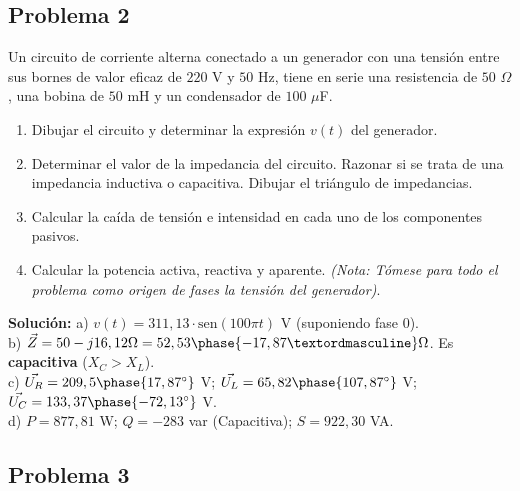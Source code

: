 \documentclass[
  a4paper,
  DIV=11,
  numbers=noendperiod]{scrreprt}
\providecommand{\tightlist}{%
  \setlength{\itemsep}{0pt}\setlength{\parskip}{0pt}}
\begin{document}
\subsection*{Problema 2}\label{problema-2}

Un circuito de corriente alterna conectado a un generador con una
tensión entre sus bornes de valor eficaz de \(220\) V y \(50\) Hz, tiene
en serie una resistencia de \(50\) \(\Omega\), una bobina de \(50\) mH y
un condensador de \(100\) \(\mu\)F.

\begin{enumerate}
\def\labelenumi{\alph{enumi})}
\tightlist
\item
  Dibujar el circuito y determinar la expresión \(v(t)\) del generador.
\item
  Determinar el valor de la impedancia del circuito. Razonar si se trata
  de una impedancia inductiva o capacitiva. Dibujar el triángulo de
  impedancias.
\item
  Calcular la caída de tensión e intensidad en cada uno de los
  componentes pasivos.
\item
  Calcular la potencia activa, reactiva y aparente. \emph{(Nota: Tómese
  para todo el problema como origen de fases la tensión del generador)}.
\end{enumerate}

\begin{tcolorbox}[enhanced jigsaw, breakable, colback=white, left=2mm, leftrule=.75mm, rightrule=.15mm, toprule=.15mm, colframe=quarto-callout-note-color-frame, arc=.35mm, bottomrule=.15mm, opacityback=0]

\textbf{Solución:} a) \(v(t) = 311,13 \cdot \text{sen}(100\pi t)\) V
(suponiendo fase 0).\\
b) \(\vec{Z} = 50 - j16,12 \Omega =52,53 \phase{-17,87º} \Omega\). Es
\textbf{capacitiva} (\(X_C > X_L\)).\\
c) \(\vec{U_R} = 209,5 \phase{17,87^{\circ}}\) V;
\(\vec{U_L} = 65,82 \phase{107,87^{\circ}}\) V;
\(\vec{U_C} = 133,37 \phase{-72,13^{\circ}}\) V.\\
d) \(P = 877,81\) W; \(Q = -283\) var (Capacitiva); \(S = 922,30\) VA.

\end{tcolorbox}

\subsection*{Problema 3}\label{problema-3}
\end{document}
